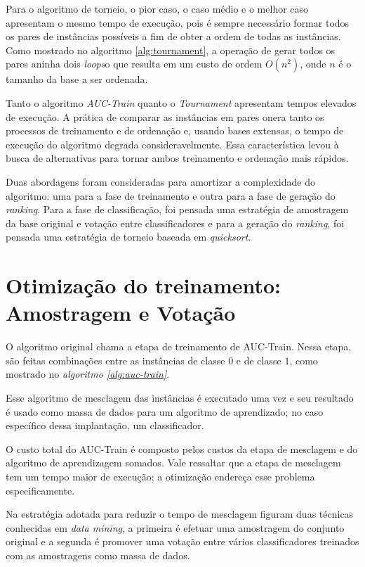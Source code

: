 Para o algoritmo de torneio, o pior caso, o caso médio e o melhor caso apresentam o mesmo tempo de execução, pois é sempre necessário formar todos os pares de instâncias possíveis a fim de obter a ordem de todas as instâncias. Como mostrado no algoritmo \ref{alg:tournament}, a operação de gerar todos os pares aninha dois \emph{loops}o que resulta em um custo de ordem $O(n^2)$, onde $n$ é o tamanho da base a ser ordenada.

Tanto o algoritmo \emph{AUC-Train} quanto o \emph{Tournament} apresentam tempos elevados de execução. A prática de comparar as instâncias em pares onera tanto os processos de treinamento e de ordenação e, usando bases extensas, o tempo de execução do algoritmo degrada consideravelmente. Essa característica levou à busca de alternativas para tornar ambos treinamento e ordenação mais rápidos.

Duas abordagens foram consideradas para amortizar a complexidade do algoritmo: uma para a fase de treinamento e outra para a fase de geração do \emph{ranking}. Para a fase de classificação, foi pensada uma estratégia de amostragem da base original e votação entre classificadores e para a geração do \emph{ranking}, foi pensada uma estratégia de torneio baseada em \emph{quicksort}.

\section{Otimização do treinamento: Amostragem e Votação}
O algoritmo original chama a etapa de treinamento de AUC-Train. Nessa etapa, são feitas combinações entre as instâncias de classe $0$ e de classe $1$, como mostrado no \emph{algoritmo \ref{alg:auc-train}}.

Esse algoritmo de mesclagem das instâncias é executado uma vez e seu resultado é usado como massa de dados para um algoritmo de aprendizado; no caso específico dessa implantação, um classificador.

O custo total do AUC-Train é composto pelos custos da etapa de mesclagem e do algoritmo de aprendizagem somados. Vale ressaltar que a etapa de mesclagem tem um tempo maior de execução; a otimização endereça esse problema especificamente.

Na estratégia adotada para reduzir o tempo de mesclagem figuram duas técnicas conhecidas em \emph{data mining}, a primeira é efetuar uma amostragem do conjunto original e a segunda é promover uma votação entre vários classificadores treinados com as amostragens como massa de dados.

